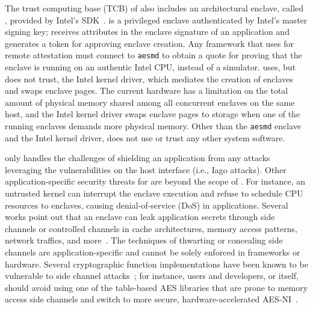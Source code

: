 The trust computing base (TCB) of \graphenesgx{} also includes
an architectural enclave,
called , provided by Intel's \sgx{} SDK~\cite{intel-sgx-linux-sdk}.
 is a privileged enclave
authenticated by Intel's master signing key;
 receives attributes in the enclave signature of an application
and generates a token for approving enclave creation.
Any framework that uses \sgx{} for remote attestation must connect to {\tt aesmd}
to obtain a quote for proving that the enclave is running on an authentic Intel CPU, instead of a simulator. 
\graphenesgx{} uses, but does not trust, the Intel \sgx{} kernel driver, which mediates the creation of enclaves and swaps enclave pages.
The current \sgx{} hardware
has a \sgxepcsize{} limitation on the total amount of physical memory shared among all concurrent enclaves on the same host,
and the Intel \sgx{} kernel driver swaps enclave pages to storage
when one of the running enclaves demands more
physical memory.
Other than the {\tt aesmd} enclave and the Intel \sgx{} kernel driver, \graphenesgx{} does not use or trust any other system software.



\graphenesgx{} only handles the challenges of shielding an application from any attacks leveraging the vulnerabilities on the host interface (i.e., Iago attacks).
Other application-specific security threats
for \sgx{} are beyond the scope of \graphenesgx{}.
For instance, an untrusted kernel
can interrupt the enclave execution and refuse to schedule CPU resources to enclaves,
causing denial-of-service (DoS) in applications.
Several works point out that
an enclave can leak application secrets through
side channels or controlled channels
in cache architectures, memory access patterns, network traffics, and more~\cite{xu15controlledchannel,atc17side-channel,chen17side-channel,gotzfried17cache-attack,moghimi17cachezoom,xiao17stacco,wang17side-channel}.
The techniques of thwarting or concealing side channels are application-specific and cannot be solely enforced in \sgx{} frameworks or hardware.
Several cryptographic function implementations
have been known to be vulnerable to side channel attacks~\cite{zhou2005side-channels,yarom2017cachebleed};
for instance, users and developers, or \graphenesgx{} itself, should avoid using one of the table-based AES libraries that are prone to memory access side channels
and switch to more secure,
hardware-accelerated AES-NI~\cite{hofemeier2012aesni}.


